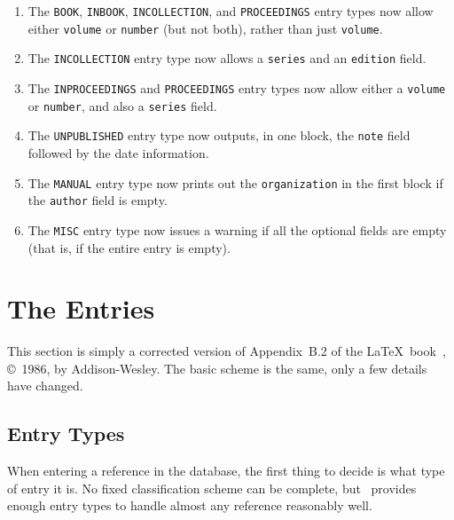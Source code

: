 \begin{enumerate}
\item
The \hbox{\tt BOOK}, \hbox{\tt INBOOK}, \hbox{\tt INCOLLECTION},
and \hbox{\tt PROCEEDINGS} entry types now allow either
\hbox{\tt volume} or \hbox{\tt number} (but not both),
rather than just \hbox{\tt volume}.

\item
The \hbox{\tt INCOLLECTION} entry type now allows
a \hbox{\tt series} and an \hbox{\tt edition} field.

\item
The \hbox{\tt INPROCEEDINGS} and \hbox{\tt PROCEEDINGS}
entry types now allow either a \hbox{\tt volume} or \hbox{\tt number},
and also a \hbox{\tt series} field.

\item
The \hbox{\tt UNPUBLISHED} entry type now outputs,
in one block, the \hbox{\tt note} field
followed by the date information.

\item
The \hbox{\tt MANUAL} entry type now prints out
the \hbox{\tt organization} in the first block
if the \hbox{\tt author} field is empty.

\item
The {\tt MISC} entry type now issues a warning
if all the optional fields are empty
(that is, if the entire entry is empty).

\end{enumerate}


\section{The Entries}
\label{latex-appendix}

This section is simply a corrected version of
Appendix~B.2 of the \LaTeX\ book~\cite{latex},
\copyright~1986, by Addison-Wesley.
The basic scheme is the same, only a few details have changed.


\subsection{Entry Types}

When entering a reference in the database, the first thing to decide
is what type of entry it is.  No fixed classification scheme can be
complete, but \BibTeX\ provides enough entry types to handle almost
any reference reasonably well.

